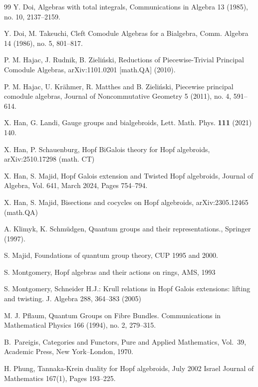 \documentclass[a4paper,reqno]{amsart}
\numberwithin{equation}{section}
\theoremstyle{plain}
\theoremstyle{remark}
\numberwithin{equation}{section}
\begin{document}
\begin{thebibliography}{99}
Y. Doi, {Algebras with total integrals}, Communications in Algebra 13 (1985), no. 10, 2137--2159.

Y. Doi, M. Takeuchi,
{Cleft Comodule Algebras for a Bialgebra},
Comm. Algebra 14 (1986), no. 5, 801--817.



P. M. Hajac, J. Rudnik, B. Zieli{\'n}ski,
{Reductions of Piecewise-Trivial Principal Comodule Algebras},
arXiv:1101.0201 [math.QA] (2010).

 P. M. Hajac, U. Krähmer, R. Matthes and B. Zieliński, {Piecewise principal comodule algebras}, Journal of Noncommutative Geometry 5 (2011), no. 4, 591--614.

X. Han, G. Landi, Gauge groups and bialgebroids,
Lett. Math. Phys. {\bf 111} (2021) 140.

 X. Han, P. Schauenburg, {Hopf BiGalois theory for Hopf algebroids}, arXiv:2510.17298  (math. CT)



 X. Han, S. Majid, Hopf Galois extension and Twisted Hopf algebroids, Journal of Algebra, Vol. 641, March 2024, Pages 754--794.



 X. Han, S. Majid, Bisections and cocycles on Hopf algebroids, 	arXiv:2305.12465 (math.QA)




A. Klimyk, K. Schm\"udgen,
{Quantum groups and their representations.}, Springer (1997).


S. Majid,
{Foundations of quantum group theory},
 CUP 1995 and 2000.

S. Montgomery,
 Hopf algebras  and their actions on rings,  AMS, 1993

S. Montgomery, Schneider H.J.: Krull relations in Hopf Galois extensions: lifting and twisting. J. Algebra 288, 364--383 (2005)

M. J. Pflaum, Quantum Groups on Fibre Bundles. Communications in Mathematical Physics 166 (1994), no. 2, 279--315.

B.~Pareigis,
Categories and Functors,
Pure and Applied Mathematics, Vol.~39,
Academic Press, New York--London, 1970.

H. Phung,
{Tannaka-Krein duality for Hopf algebroids},
July 2002 Israel Journal of Mathematics 167(1), Pages 193--225.


\end{thebibliography}
\end{document}

